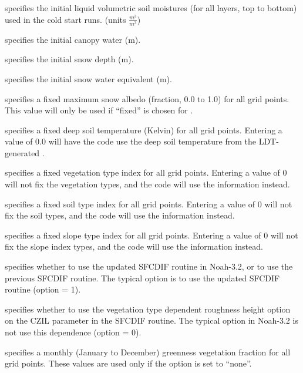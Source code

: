   specifies the
 initial liquid volumetric soil moistures (for all layers,
 top to bottom) used in the cold start runs.
 (units $\frac{m^3}{m^3}$)

  specifies the initial
 canopy water (m).

  specifies the initial
 snow depth (m).

  specifies the initial
 snow water equivalent (m).

  specifies a fixed maximum
 snow albedo (fraction, 0.0 to 1.0) for all grid points.  This
 value will only be used if ``fixed'' is chosen for
 .

  specifies a fixed
 deep soil temperature (Kelvin) for all grid points.  Entering
 a value of 0.0 will have the code use the deep soil temperature
 from the LDT-generated .

  specifies a fixed
 vegetation type index for all grid points.  Entering a value
 of 0 will not fix the vegetation types, and the code will use
 the  information instead.

  specifies a fixed soil
 type index for all grid points.  Entering a value of 0
 will not fix the soil types, and the code will use the
  information instead.

  specifies a fixed slope
 type index for all grid points.  Entering a value of 0 will
 not fix the slope index types, and the code will use the
  information instead.

  specifies whether to use the updated
 SFCDIF routine in Noah-3.2, or to use the previous SFCDIF routine.
 The typical option is to use the updated SFCDIF routine (option = 1).

  specifies whether
 to use the vegetation type dependent roughness height option
 on the CZIL parameter in the SFCDIF routine.  The typical option
 in Noah-3.2 is not use this dependence (option = 0).

  specifies a monthly (January
 to December) greenness vegetation fraction for all grid points.
 These values are used only if the 
 option is set to ``none''.


